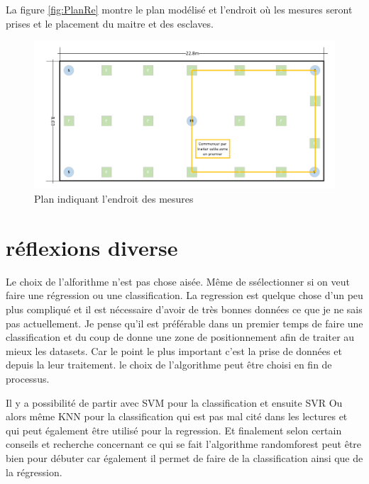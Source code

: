 La figure \ref{fig:PlanRe} montre le plan modélisé et l'endroit où les mesures seront prises et le placement du maitre et des esclaves.
\begin{figure}[H]
	\begin{center}
		\includegraphics[scale=0.4]{figures/PlanMod.png}
		\caption{Plan indiquant l'endroit des mesures}
		\label{fig:PlanMod} %
	\end{center}
\end{figure}

\section{réflexions diverse}
Le choix de l'alforithme n'est pas chose aisée. Même de ssélectionner si on veut faire une régression ou une classification. La regression est quelque chose d'un peu plus compliqué et il est nécessaire d'avoir de très bonnes données ce que je ne sais pas actuellement. Je pense qu'il est préférable dans un premier temps de faire une classification et du coup de donne une zone de positionnement afin de traiter au mieux les datasets. Car le point le plus important c'est la prise de données et depuis la leur traitement. le choix de l'algorithme peut être choisi en fin de processus. 

Il y a possibilité de partir avec SVM pour la classification et ensuite SVR 
Ou alors même KNN pour la classification qui est pas mal cité dans les lectures et qui peut également être utilisé pour la regression.
Et finalement selon certain conseils et recherche concernant ce qui se fait l'algorithme randomforest peut être bien pour débuter car également il permet de faire de la classification ainsi que de la régression.




